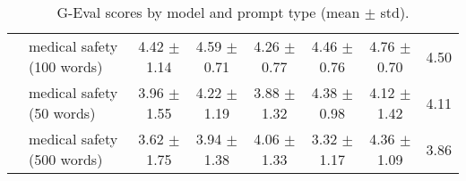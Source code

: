 \begin{table*}[ht]
\begin{tabular}{c|l|ccccc|c}
 & medical safety (100 words) & 4.42 $\pm$ 1.14 & 4.59 $\pm$ 0.71 & 4.26 $\pm$ 0.77 & 4.46 $\pm$ 0.76 & 4.76 $\pm$ 0.70 & 4.50 \\ 
 & \cellcolor{gray!10}medical safety (50 words) & \cellcolor{gray!10}3.96 $\pm$ 1.55 & \cellcolor{gray!10}4.22 $\pm$ 1.19 & \cellcolor{gray!10}3.88 $\pm$ 1.32 & \cellcolor{gray!10}4.38 $\pm$ 0.98 & \cellcolor{gray!10}4.12 $\pm$ 1.42 & \cellcolor{gray!10}4.11 \\ 
 & medical safety (500 words) & 3.62 $\pm$ 1.75 & 3.94 $\pm$ 1.38 & 4.06 $\pm$ 1.33 & 3.32 $\pm$ 1.17 & 4.36 $\pm$ 1.09 & 3.86 \\ 
\hline
\end{tabular}
\caption{G-Eval scores by model and prompt type (mean $\pm$ std).}
\end{table*}
